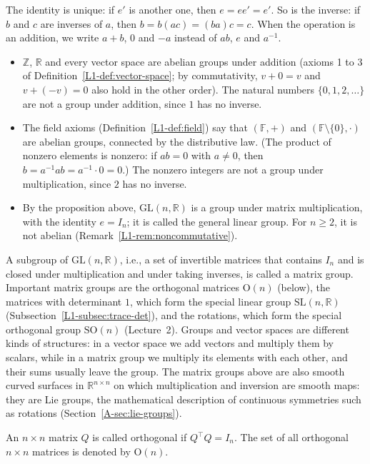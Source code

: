 The identity is unique: if $e'$ is another one, then $e = ee' = e'$. So is the inverse: if $b$ and $c$ are inverses of $a$, then $b = b(ac) = (ba)c = c$. When the operation is an addition, we write $a + b$, $0$ and $-a$ instead of $ab$, $e$ and $a^{-1}$.
\begin{itemize}
    \item $\mathbb{Z}$, $\mathbb{R}$ and every vector space are abelian groups under addition (axioms 1 to 3 of Definition~\ref{L1-def:vector-space}; by commutativity, $v + 0 = v$ and $v + (-v) = 0$ also hold in the other order). The natural numbers $\{0, 1, 2, \ldots\}$ are not a group under addition, since $1$ has no inverse.
    \item The field axioms (Definition~\ref{L1-def:field}) say that $(\mathbb{F}, +)$ and $(\mathbb{F} \setminus \{0\}, \cdot)$ are abelian groups, connected by the distributive law. (The product of nonzero elements is nonzero: if $ab = 0$ with $a \neq 0$, then $b = a^{-1}ab = a^{-1} \cdot 0 = 0$.) The nonzero integers are not a group under multiplication, since $2$ has no inverse.
    \item By the proposition above, $\mathrm{GL}(n, \mathbb{R})$ is a group under matrix multiplication, with the identity $e = I_n$; it is called the general linear group. For $n \geq 2$, it is not abelian (Remark~\ref{L1-rem:noncommutative}).
\end{itemize}
A subgroup of $\mathrm{GL}(n, \mathbb{R})$, i.e., a set of invertible matrices that contains $I_n$ and is closed under multiplication and under taking inverses, is called a matrix group. Important matrix groups are the orthogonal matrices $\mathrm{O}(n)$ (below), the matrices with determinant $1$, which form the special linear group $\mathrm{SL}(n, \mathbb{R})$ (Subsection~\ref{L1-subsec:trace-det}), and the rotations, which form the special orthogonal group $\mathrm{SO}(n)$ (Lecture~2). Groups and vector spaces are different kinds of structures: in a vector space we add vectors and multiply them by scalars, while in a matrix group we multiply its elements with each other, and their sums usually leave the group. The matrix groups above are also smooth curved surfaces in $\mathbb{R}^{n \times n}$ on which multiplication and inversion are smooth maps: they are Lie groups, the mathematical description of continuous symmetries such as rotations (Section~\ref{A-sec:lie-groups}).

\begin{definition}
    An $n \times n$ matrix $Q$ is called orthogonal if $Q^\top Q = I_n$. The set of all orthogonal $n \times n$ matrices is denoted by $\mathrm{O}(n)$.
\end{definition}

